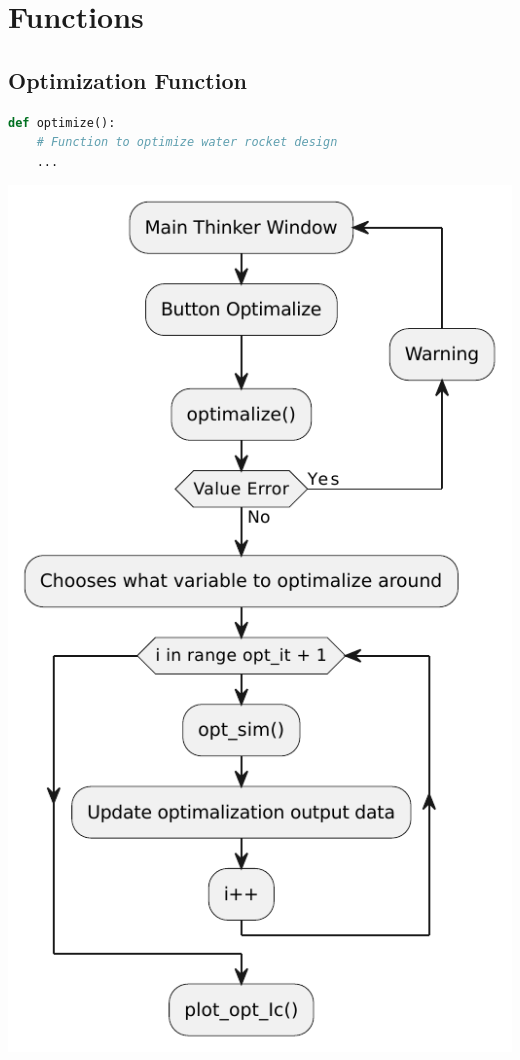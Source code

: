 \documentclass{report}
\begin{document}
\chapter{Functions}

\section{Optimization Function}

\begin{lstlisting}[language=Python]
def optimize():
    # Function to optimize water rocket design
    ...
\end{lstlisting}
\begin{center}
\includegraphics[scale=0.6]{optimalization}
\end{center}
\end{document}
